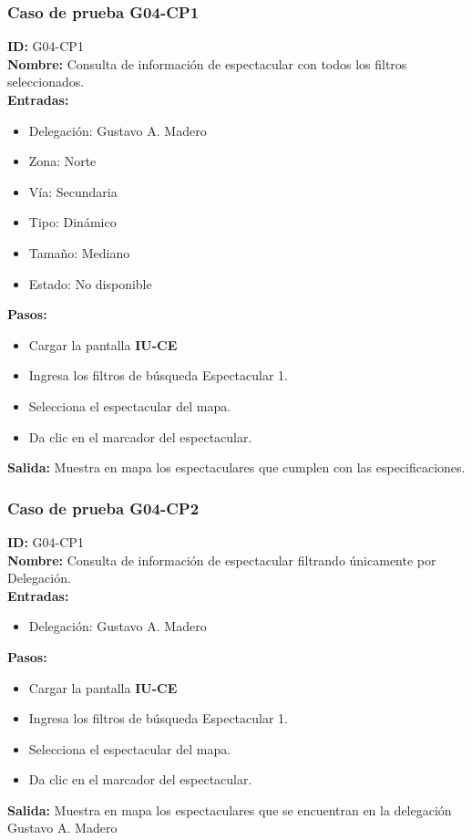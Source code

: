 \subsubsection{Caso de prueba G04-CP1}
\textbf{ID:} G04-CP1\\
\textbf{Nombre:} Consulta de información de espectacular con todos los filtros seleccionados.\\
\textbf{Entradas:} 
\begin{itemize}
    \item Delegación: Gustavo A. Madero
    \item Zona: Norte
    \item Vía: Secundaria
    \item Tipo: Dinámico 
    \item Tamaño: Mediano
    \item Estado: No disponible
\end{itemize}
\textbf{Pasos:}\\
\begin{itemize}
    \item Cargar la pantalla \textbf{IU-CE}
    \item Ingresa los filtros de búsqueda Espectacular 1.
    \item Selecciona el espectacular del mapa. 
    \item Da clic en el marcador del espectacular.
\end{itemize}
\textbf{Salida:}
Muestra en mapa los espectaculares que cumplen con las especificaciones.

\subsubsection{Caso de prueba G04-CP2}
\textbf{ID:} G04-CP1\\
\textbf{Nombre:} Consulta de información de espectacular filtrando únicamente por Delegación.\\
\textbf{Entradas:} 
\begin{itemize}
    \item Delegación: Gustavo A. Madero
\end{itemize}
\textbf{Pasos:}\\
\begin{itemize}
    \item Cargar la pantalla \textbf{IU-CE}
    \item Ingresa los filtros de búsqueda Espectacular 1.
    \item Selecciona el espectacular del mapa. 
    \item Da clic en el marcador del espectacular.
\end{itemize}
\textbf{Salida:}
Muestra en mapa los espectaculares que se encuentran en la delegación Gustavo A. Madero

